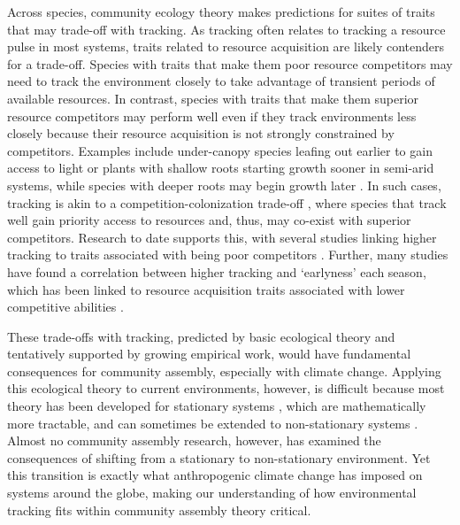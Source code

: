 \documentclass[11pt,letterpaper]{article}
\begin{document}
Across species, community ecology theory makes predictions for suites of traits that may trade-off with tracking. As tracking often relates to tracking a resource pulse in most systems, traits related to resource acquisition are likely contenders for a trade-off. Species with traits that make them poor resource competitors may need to track the environment closely to take advantage of transient periods of available resources. In contrast, species with traits that make them superior resource competitors may perform well even if they track environments less closely because their resource acquisition is not strongly constrained by competitors. Examples include under-canopy species leafing out earlier to gain access to light \citep{heberling2019} or plants with shallow roots starting growth sooner in semi-arid systems, while species with deeper roots may begin growth later \citep{Zhu2016BioLetters}. In such cases, tracking is akin to a competition-colonization trade-off \citep{Amarasekare:2003tq}, where species that track well gain priority access to resources and, thus, may co-exist with superior competitors. Research to date supports this, with several studies linking higher tracking to traits associated with being poor competitors \citep{Dorji2013,lasky2016,Zhu2016BioLetters}. Further, many studies have found a correlation between higher tracking and `earlyness' each season, which has been linked to resource acquisition traits associated with lower competitive abilities \citep[][, see Box: `Trait trade-offs with tracking']{wolkovich2014aob}. 

These trade-offs with tracking, predicted by basic ecological theory and tentatively supported by growing empirical work, would have fundamental consequences for community assembly, especially with climate change. Applying this ecological theory to current environments, however, is difficult because most theory has been developed for stationary systems \citep[as is the case in other sciences, ][]{Milly:2008yu}, which are mathematically more tractable, and can sometimes be extended to non-stationary systems \citep{chessonnonstat}. Almost no community assembly research, however, has examined the consequences of shifting from a stationary to non-stationary environment. Yet this transition is exactly what anthropogenic climate change has imposed on systems around the globe, making our understanding of how environmental tracking fits within community assembly theory critical. 
\end{document}
